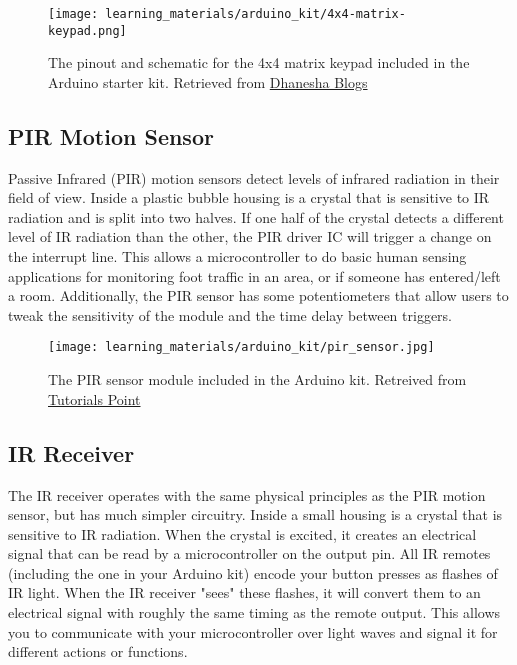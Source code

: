     \begin{figure}[h!]
        \texttt{[image: learning\_materials/arduino\_kit/4x4-matrix-keypad.png]}
        \caption[4x4 Matrix Keypad]{The pinout and schematic for the 4x4 matrix keypad included in the Arduino starter kit. 
        Retrieved from \href{https://dhaneshablogs.blogspot.com/2019/08/interfacing-4x4-matrix-keypad-with.html}
        {Dhanesha Blogs}}
    \end{figure}

    \subsection*{PIR Motion Sensor}
    Passive Infrared (PIR) motion sensors detect levels of infrared radiation in their field of view.
    Inside a plastic bubble housing is a crystal that is sensitive to IR radiation and is split into two halves.
    If one half of the crystal detects a different level of IR radiation than the other, the PIR driver IC will trigger a change on the interrupt line.
    This allows a microcontroller to do basic human sensing applications for monitoring foot traffic in an area, or if someone has entered/left a room.
    Additionally, the PIR sensor has some potentiometers that allow users to tweak the sensitivity of the module and the time delay between triggers.

    \begin{figure}[h!]
        \texttt{[image: learning\_materials/arduino\_kit/pir\_sensor.jpg]}
        \caption[PIR Sensor]{The PIR sensor module included in the Arduino kit. 
        Retreived from \href{https://www.tutorialspoint.com/arduino/arduino_pir_sensor.htm}
        {Tutorials Point}}
    \end{figure}

    \subsection*{IR Receiver}
    The IR receiver operates with the same physical principles as the PIR motion sensor, but has much simpler circuitry.
    Inside a small housing is a crystal that is sensitive to IR radiation.
    When the crystal is excited, it creates an electrical signal that can be read by a microcontroller on the output pin.
    All IR remotes (including the one in your Arduino kit) encode your button presses as flashes of IR light.
    When the IR receiver "sees" these flashes, it will convert them to an electrical signal with roughly the same timing as the remote output.
    This allows you to communicate with your microcontroller over light waves and signal it for different actions or functions.

